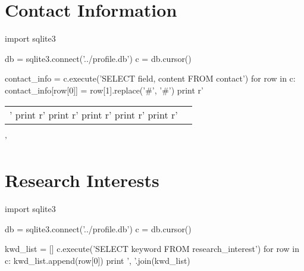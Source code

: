 \documentclass[margin,line]{res}
\begin{document}

\begin{resume}
\section{\sc Contact Information}
\vspace{.05in}
\begin{pycode}
import sqlite3

db = sqlite3.connect('../profile.db')
c = db.cursor()

contact_info = {}
c.execute('SELECT field, content FROM contact')
for row in c:
  contact_info[row[0]] = row[1].replace('#', '\#')
print r'\begin{tabular}{@{}p{3in}p{4in}}'
print r'%
print r'%
print r'%
print r'%
print r'\end{tabular}'
\end{pycode}


\section{\sc Research Interests}
\begin{pycode}
import sqlite3

db = sqlite3.connect('../profile.db')
c = db.cursor()

kwd_list = []
c.execute('SELECT keyword FROM research_interest')
for row in c:
  kwd_list.append(row[0])
print ', '.join(kwd_list)
\end{pycode}


\end{resume}
\end{document}

